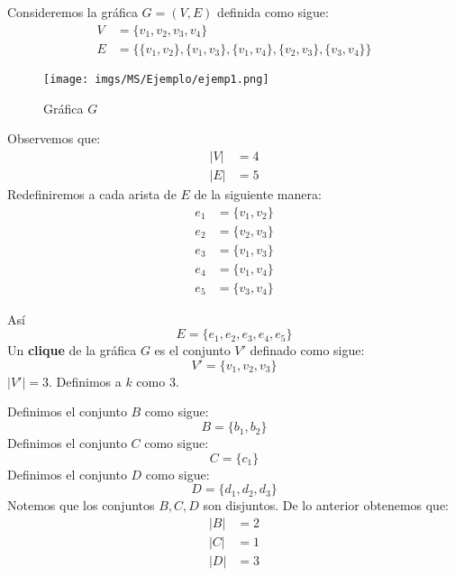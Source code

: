 \documentclass[spanish, xcolor=dvipsnames, aspectratio=169]{beamer}
\newcommand{\subsectiontitle}{}
\begin{document}
\subsection{\subsectiontitle}
\begin{frame}{\subsectiontitle}
Consideremos la gráfica \(G = \left(V, E\right)\) definida como sigue:
\begin{align*}
    V &= \{v_{1}, v_{2}, v_{3}, v_{4}\} \\
    E &= \{\{v_{1}, v_{2}\},\{v_{1}, v_{3}\}, \{v_{1}, v_{4}\}, \{v_{2}, v_{3}\}, \{v_{3}, v_{4}\}\}
\end{align*}
\begin{figure}[H]
    \centering
    \texttt{[image: imgs/MS/Ejemplo/ejemp1.png]}
    \caption{Gráfica \(G\)}
\end{figure}
\end{frame}
\begin{frame}{\subsectiontitle}
Observemos que:
\begin{align*}
    |V| &= 4 \\
    |E| &= 5
\end{align*}
Redefiniremos a cada arista de \(E\) de la siguiente manera:
\begin{align*}
    e_{1} &= \{v_{1}, v_{2}\} \\
    e_{2} &= \{v_{2}, v_{3}\} \\
    e_{3} &= \{v_{1}, v_{3}\} \\
    e_{4} &= \{v_{1}, v_{4}\} \\
    e_{5} &= \{v_{3}, v_{4}\}
\end{align*}
\end{frame}
\begin{frame}{\subsectiontitle}
Así
\[
    E = \{e_{1}, e_{2}, e_{3}, e_{4}, e_{5}\}  
\]
Un \textbf{clique} de la gráfica \(G\) es el conjunto \(V'\) definado como sigue:
\[
    V' = \{v_{1}, v_{2}, v_{3}\} 
\]
\(|V'| = 3\). Definimos a \(k\) como \(3\).
\end{frame}
\begin{frame}{\subsectiontitle}
Definimos el conjunto \(B\) como sigue:
\[
    B = \{b_{1}, b_{2}\}
\]
Definimos el conjunto \(C\) como sigue:
\[
    C = \{c_{1}\}
\]
Definimos el conjunto \(D\) como sigue:
\[
    D = \{d_{1}, d_{2}, d_{3}\}
\]
Notemos que los conjuntos \(B, C, D\) son disjuntos.
\newline 
De lo anterior obtenemos que:
\begin{align*}
    |B| &= 2 \\
    |C| &= 1 \\
    |D| &= 3 \\
\end{align*}
\newline 
\end{frame}
\end{document}
